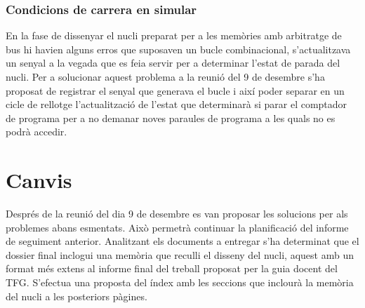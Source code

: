 \documentclass[conference,onecolumn, catalan]{IEEEtran}
\begin{document}
\subsubsection{Condicions de carrera en simular} 

En la fase de dissenyar el nucli preparat per a les memòries amb arbitratge de bus hi havien alguns erros que suposaven un bucle combinacional, s'actualitzava un senyal a la vegada que es feia servir per a determinar l'estat de parada del nucli.
Per a solucionar aquest problema a la reunió del 9 de desembre s'ha proposat de registrar el senyal que generava el bucle i així poder separar en un cicle de rellotge l'actualització de l'estat que determinarà si parar el comptador de programa per a no demanar noves paraules de programa a les quals no es podrà accedir.









\section{Canvis}
Després de la reunió del dia 9 de desembre es van proposar les solucions per als problemes abans esmentats. Això permetrà continuar la planificació del informe de seguiment anterior. Analitzant els documents a entregar s'ha determinat que el dossier final inclogui una memòria que reculli el disseny del nucli, aquest amb un format més extens al informe final del treball proposat per la guia docent del TFG. S'efectua una proposta del índex amb les seccions que inclourà la memòria del nucli a les posteriors pàgines.











\end{document}
